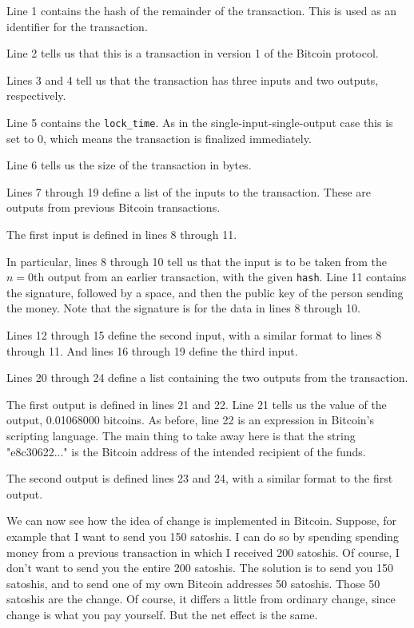 \documentclass[12pt]{book}
\newcounter{example}[chapter]
\begin{document}
Line 1 contains the hash of the remainder of the transaction.  This is
used as an identifier for the transaction.

Line 2 tells us that this is a transaction in version 1 of the Bitcoin
protocol.

Lines 3 and 4 tell us that the transaction has three inputs and two
outputs, respectively.

Line 5 contains the \verb|lock_time|.  As in the
single-input-single-output case this is set to 0, which means the
transaction is finalized immediately.

Line 6 tells us the size of the transaction in bytes.

Lines 7 through 19 define a list of the inputs to the transaction.
These are outputs from previous Bitcoin transactions.

The first input is defined in lines 8 through 11.  

In particular, lines 8 through 10 tell us that the input is to be
taken from the $n=0$th output from an earlier transaction, with the
given \verb|hash|.  Line 11 contains the signature, followed by a
space, and then the public key of the person sending the money.  Note
that the signature is for the data in lines 8 through 10.

Lines 12 through 15 define the second input, with a similar format to
lines 8 through 11.  And lines 16 through 19 define the third input.

Lines 20 through 24 define a list containing the two outputs from the
transaction.

The first output is defined in lines 21 and 22.  Line 21 tells us the
value of the output, 0.01068000 bitcoins.  As before, line 22 is an
expression in Bitcoin's scripting language.  The main thing to take
away here is that the string "e8c30622..." is the Bitcoin address of
the intended recipient of the funds.

The second output is defined lines 23 and 24, with a similar format to
the first output.

We can now see how the idea of change is implemented in Bitcoin.
Suppose, for example that I want to send you 150 satoshis.  I can do
so by spending spending money from a previous transaction in which I
received 200 satoshis.  Of course, I don't want to send you the entire
200 satoshis.  The solution is to send you 150 satoshis, and to send
one of my own Bitcoin addresses 50 satoshis.  Those 50 satoshis are
the change.  Of course, it differs a little from ordinary change,
since change is what you pay yourself.  But the net effect is the
same.
\end{document}
